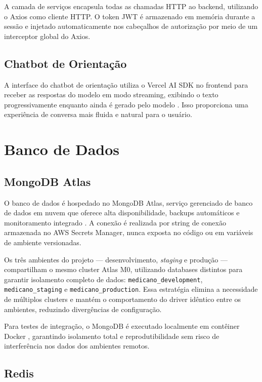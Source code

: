 A camada de serviços encapsula todas as chamadas
HTTP ao backend, utilizando o Axios como cliente
HTTP. O token JWT é armazenado em memória durante
a sessão e injetado automaticamente nos cabeçalhos
de autorização por meio de um interceptor global
do Axios.

\subsection{Chatbot de Orientação}
\label{subsec:chat-frontend}

A interface do chatbot de orientação utiliza o Vercel
AI SDK no frontend para receber as respostas do
modelo em modo streaming, exibindo o texto
progressivamente enquanto ainda é gerado pelo
modelo \cite{vercelaisdk2024}. Isso proporciona
uma experiência de conversa mais fluida e natural
para o usuário.

\section{Banco de Dados}
\label{sec:database}

\subsection{MongoDB Atlas}
\label{subsec:mongodb-atlas}

O banco de dados é hospedado no MongoDB Atlas,
serviço gerenciado de banco de dados em nuvem que
oferece alta disponibilidade, backups automáticos
e monitoramento integrado \cite{sadalage2012}.
A conexão é realizada por string de conexão
armazenada no AWS Secrets Manager, nunca exposta
no código ou em variáveis de ambiente versionadas.

Os três ambientes do projeto — desenvolvimento,
\textit{staging} e produção — compartilham o mesmo
cluster Atlas M0, utilizando databases distintos
para garantir isolamento completo de dados:
\texttt{medicano\_development},
\texttt{medicano\_staging} e
\texttt{medicano\_production}. Essa estratégia
elimina a necessidade de múltiplos clusters e
mantém o comportamento do driver idêntico entre
os ambientes, reduzindo divergências de
configuração.

Para testes de integração, o MongoDB é executado
localmente em contêiner Docker \cite{docker2024},
garantindo isolamento total e reprodutibilidade
sem risco de interferência nos dados dos ambientes
remotos.

\subsection{Redis}
\label{subsec:redis-arch}

